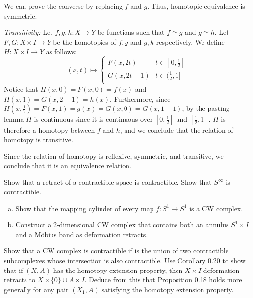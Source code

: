 \begin{homework}[e]
\begin{prf}
\begin{enumerate}[(a)]
			We can prove the converse by replacing $f$ and $g$. Thus, homotopic equivalence is symmetric. 
			
			\bigskip
			
			\emph{Transitivity:} Let $f,g,h: X \rightarrow Y$ be functions such that $f \simeq g$ and $g \simeq h$. Let $F,G: X \times I \rightarrow Y$ be the homotopies of $f,g$ and $g, h$ respectively. We define $H: X \times I \rightarrow Y$ as follows:
			\begin{equation*}
			(x,t) \mapsto
			 \begin{cases}
				F(x,2t) & t \in [0, \frac{1}{2}] \\
				G(x,2t - 1) & t \in (\frac{1}{2}, 1] \\
			 \end{cases}
			\end{equation*}
			Notice that $H(x,0) = F(x,0) = f(x)$ and $H(x,1) = G(x,2-1) = h(x)$. Furthermore, since $H(x,\frac{1}{2}) = F(x,1) = g(x) = G(x,0) = G(x,1 - 1)$, by the pasting lemma $H$ is continuous since it is continuous over $[0,\frac{1}{2}]$ and $[\frac{1}{2},1]$. $H$ is therefore a homotopy between $f$ and $h$, and we conclude that the relation of homotopy is transitive.
			
			\bigskip
			
			Since the relation of homotopy is reflexive, symmetric, and transitive, we conclude that it is an equivalence relation.
		\end{enumerate}
	\end{prf}

	\prob Show that a retract of a contractible space is contractible.
	\prob Show that $S^\infty$ is contractible.
	\prob $ $
	\begin{enumerate}[(a)]
		\item Show that the mapping cylinder of every map $f:S^1 \to S^1$ is a CW complex.
		\item Construct a 2-dimensional CW complex that contains both an annulus $S^1\times I$ and a M\"obius band as deformation retracts.
	\end{enumerate}
	\prob Show that a CW complex is contractible if is the union of two contractible subcomplexes whose intersection is also contractible.
	\prob Use Corollary 0.20 to show that if $(X,A)$ has the homotopy extension property, then $X\times I$ deformation retracts to $X\times \{0\}\cup A\times I$. Deduce from this that Proposition 0.18 holds more generally for any pair $(X_1,A)$ satisfying the homotopy extension property.
\end{homework}

